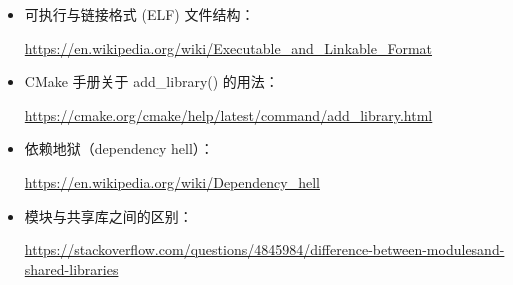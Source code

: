

\begin{itemize}
\item
可执行与链接格式 (ELF) 文件结构：

\url{https://en.wikipedia.org/wiki/Executable_and_Linkable_Format}

\item
CMake 手册关于 add\_library() 的用法：

\url{https://cmake.org/cmake/help/latest/command/add_library.html}

\item
依赖地狱（dependency hell）：

\url{https://en.wikipedia.org/wiki/Dependency_hell}

\item
模块与共享库之间的区别：

\url{https://stackoverflow.com/questions/4845984/difference-between-modulesand-shared-libraries}
\end{itemize}